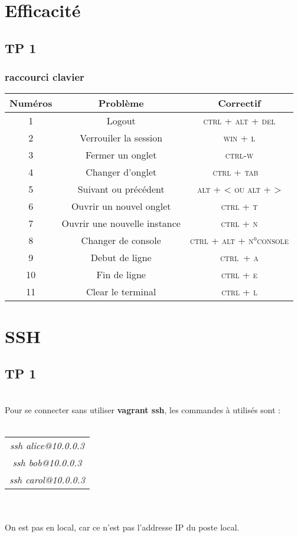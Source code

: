 \documentclass{report}
\begin{document}
\chapter{Efficacité}
\section{TP 1}
 
\subsection{raccourci clavier}
\begin{tabular}{|c|c|c|}
	\hline
	\textbf{Numéros} &  \textbf{Problème} & \textbf{Correctif} \\ 
	\hline
	1 & Logout & \textsc{ctrl + alt + del} \\
	\hline
	2 & Verrouiler la session & \textsc{win + l} \\
	\hline  
	3 & Fermer un onglet & \textsc{ctrl-w} \\
	\hline
	4 & Changer d'onglet & \textsc{ctrl + tab}  \\
	\hline
	5 & Suivant ou précédent & \textsc{alt + < ou alt + >} \\
	\hline 
	6 & Ouvrir un nouvel onglet & \textsc{ctrl + t} \\
	\hline
	7 & Ouvrir une nouvelle instance & \textsc{ctrl + n} \\
	\hline 
	8 & Changer de console & \textsc{ctrl + alt + n°console} \\
	\hline 
	9 & Debut de ligne & \textsc{ctrl + a} \\
	\hline 
	10 & Fin de ligne & \textsc{ctrl + e} \\
	\hline 
	11 & Clear le terminal & \textsc{ctrl + l} \\
	\hline 
\end{tabular}


\chapter{SSH}

\section{TP 1}
\\
Pour se connecter sans utiliser \textbf{vagrant ssh}, les commandes à utilisés sont : \\
\\
\begin{tabular}{|c|}
\hline
\textit{ssh alice@10.0.0.3} \\
\textit{ssh bob@10.0.0.3} \\
\textit{ssh carol@10.0.0.3} \\
\hline
\end{tabular}
\\
\\
On est pas en local, car ce n'est pas l'addresse IP du poste local.
\end{document}
